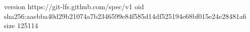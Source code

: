 version https://git-lfs.github.com/spec/v1
oid sha256:aaebba40d29b21074a7b2346599e84f585d14df525194e68bf015e24e28481a6
size 125114
